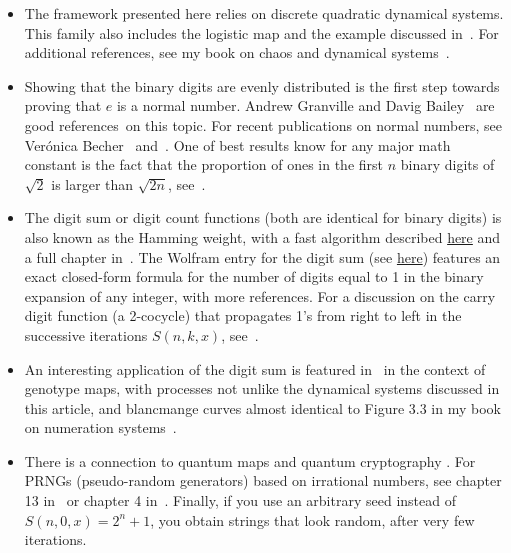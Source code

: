 \documentclass[10pt]{article}
\begin{document}
\begin{itemize}
\item The framework presented here relies on discrete \textcolor{index}{quadratic dynamical systems}. 
This family also includes the \textcolor{index}{logistic map} and the example
 discussed in~\cite{reapoh}.   For additional references, see my book on chaos and dynamical systems~\cite{vgchaos}.

\item Showing that the binary digits are evenly distributed is the first step towards proving that $e$ is a \textcolor{index}{normal number}. Andrew Granville and Davig Bailey~\cite{nt1} are good references~on this topic. 
  For recent publications on normal numbers, see Verónica Becher~\cite{vero}
and~\cite{dffs}. One of best results know for any major math constant is the fact that the proportion of ones in the first $n$ binary digits of $\sqrt{2}$ is larger than $\sqrt{2n}$, 
see~\cite{sqrt2newd}. 

\item The digit sum or digit count functions (both are identical for binary digits) is also known as the \textcolor{index}{Hamming weight}, with a fast algorithm described \href{https://stackoverflow.com/questions/14555607/number-of-bits-set-in-a-number}{here} and a full chapter in~\cite{hw}.  
The Wolfram entry for the \textcolor{index}{digit sum} (see \href{https://mathworld.wolfram.com/DigitCount.html}{here}) features an exact closed-form formula for the number of digits equal to 1 in the binary expansion of any integer, with more references. 
For a discussion on the \textcolor{index}{carry digit} function (a 
\textcolor{index}{2-cocycle}) that propagates 1's from right to left in the successive
 iterations $S(n, k, x)$, see~\cite{dcfnt9, alan}. 

\item An interesting application of the digit sum  
 is featured in~\cite{vmo} in the context of genotype maps,
 with processes not unlike the dynamical systems discussed in this article, and \textcolor{index}{blancmange curves}
 almost identical to Figure 3.3 in my book on numeration systems~\cite{vgchaos}.  

\item There is a connection to \textcolor{index}{quantum maps} and 
\textcolor{index}{quantum cryptography} \cite{qc19,qc24}.
For \textcolor{index}{PRNGs} (pseudo-random generators) based on irrational numbers, 
see chapter 13  in~\cite{vgxllm2} or chapter 4 in~\cite{vgchaos}.
Finally, if you use an arbitrary seed instead of $S(n, 0, x) = 2^n+1$, 
you obtain strings that look random, after very few iterations.


\end{itemize}
\end{document}
